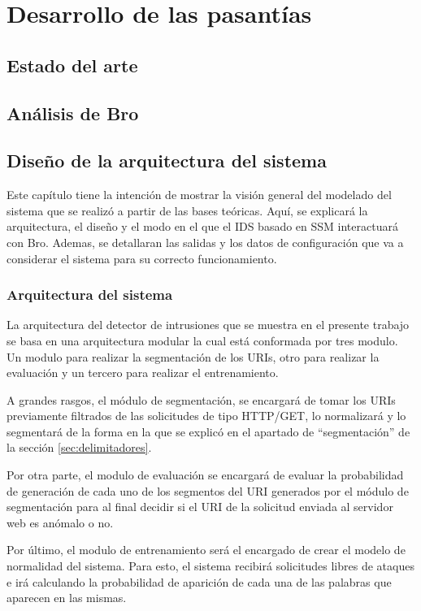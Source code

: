 \chapter{Desarrollo de las pasantías}
\label{capitulo3}

\section{Estado del arte}
\section{Análisis de Bro}
\section{Diseño de la arquitectura del sistema}

Este capítulo tiene la intención de mostrar la visión general del modelado del sistema que se realizó a partir de las bases teóricas. Aquí, se explicará la arquitectura, el diseño y el modo en el que el IDS basado en SSM interactuará con Bro. Ademas, se detallaran las salidas y los datos de configuración
que va a considerar el sistema para su correcto funcionamiento.

\subsection{Arquitectura del sistema}

La arquitectura del detector de intrusiones que se muestra en el presente trabajo se basa en una arquitectura modular la cual está conformada por tres modulo. Un modulo para realizar la segmentación de los URIs, otro  para realizar la evaluación y un tercero para realizar el entrenamiento.

A grandes rasgos, el módulo de segmentación, se encargará de tomar los URIs previamente filtrados de las solicitudes de tipo HTTP/GET, lo normalizará y lo segmentará de la forma en la que se explicó en el apartado de ``segmentación'' de la sección \ref{sec:delimitadores}.

Por otra parte, el modulo de evaluación se encargará de evaluar la probabilidad de generación de cada uno de los segmentos del URI generados por el módulo de segmentación para al final decidir si el URI de la solicitud enviada al servidor web es anómalo o no.

Por último, el modulo de entrenamiento será el encargado de crear el modelo de normalidad del sistema. Para esto, el sistema recibirá solicitudes libres de ataques e irá calculando la probabilidad de aparición de cada una de las palabras que aparecen en las mismas.

